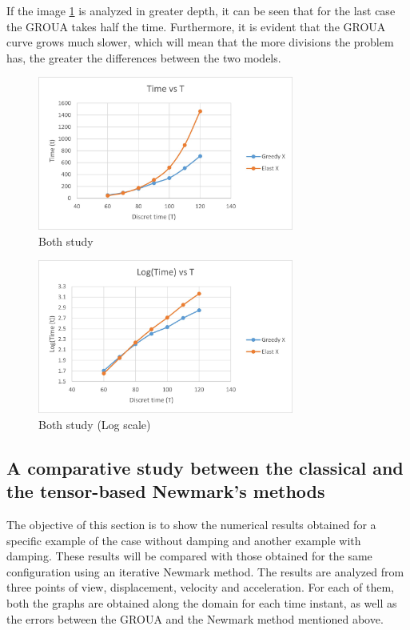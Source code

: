 \documentclass[a4paper, 10pt]{article}
\begin{document}
If the image \ref{BothStudy} is analyzed in greater depth, it can be seen that for the last case the GROUA takes half the time. Furthermore, it is evident that the GROUA curve grows much slower, which will mean that the more divisions the problem has, the greater the differences between the two models.

\begin{figure}
\centering
\includegraphics[width=0.75\textwidth]{BothStudyLong.jpg}
\caption{Both study} 
\label{BothStudy}
\end{figure}

\begin{figure}
\centering
\includegraphics[width=0.75\textwidth]{BothStudyLogLong.jpg}
\caption{Both study (Log scale)} 
\label{BothStudyLog}
\end{figure}

\subsection{A comparative study between the classical and the tensor-based Newmark's methods}

The objective of this section is to show the numerical results obtained for a specific example of the case without damping and another example with damping. These results will be compared with those obtained for the same configuration using an iterative Newmark method. The results are analyzed from three points of view, displacement, velocity and acceleration. For each of them, both the graphs are obtained along the domain for each time instant, as well as the errors between the GROUA and the Newmark method mentioned above.
\end{document}
